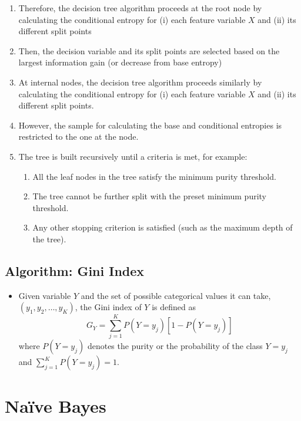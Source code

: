 \documentclass{article}
\begin{document}
\begin{enumerate}
    \item Therefore, the decision tree algorithm proceeds at the root node by calculating the conditional entropy for (i) each feature variable $X$ and (ii) its different split points
    \item Then, the decision variable and its split points are selected based on the largest information gain (or decrease from base entropy)
    \item At internal nodes, the decision tree algorithm proceeds similarly by calculating the conditional entropy for (i) each feature variable $X$ and (ii) its different split points.
    \item However, the sample for calculating the base and conditional entropies is restricted to the one at the node.
    \item The tree is built recursively until a criteria is met, for example:
    \begin{enumerate}
        \item All the leaf nodes in the tree satisfy the minimum purity threshold.
        \item The tree cannot be further split with the preset minimum purity threshold.
        \item Any other stopping criterion is satisfied (such as the maximum depth of the tree).
    \end{enumerate}

\end{enumerate}




\subsection{Algorithm: Gini Index}
\begin{itemize}
    \item Given variable $Y$ and the set of possible categorical values it can take, $(y_1, y_2, \dots, y_K)$, the Gini index of $Y$ is defined as 
    $$G_Y = \sum_{j=1}^{K}P(Y=y_j)[1-P(Y=y_j)]$$
    where $P(Y=y_j)$ denotes the purity or the probability of the class $Y=y_j$ and $\sum_{j=1}^{K}P(Y=y_j)=1$. 
\end{itemize}


\section{Naïve Bayes}
\end{document}
